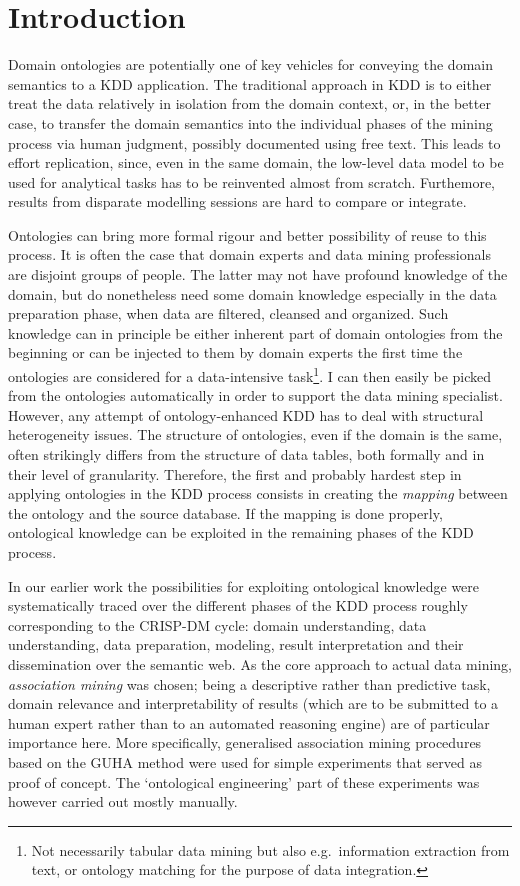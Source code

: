 \section{Introduction} \label{Introduction}

Domain ontologies are potentially one of key vehicles for conveying the domain semantics to a KDD application. 
The traditional approach in KDD is to either treat the data relatively in isolation from the domain context, or, in the better case, to transfer the domain semantics into the individual phases of the mining process via human judgment, possibly documented using free text.
This leads to effort replication, since, even in the same domain, the low-level data model to be used for analytical tasks has to be reinvented almost from scratch. 
Furthemore, results from disparate modelling sessions are hard to compare or integrate.

Ontologies can bring more formal rigour and better possibility of reuse to this process. 
It is often the case that domain experts and data mining professionals are disjoint groups of people.
The latter may not have profound knowledge of the domain, but do nonetheless need some domain knowledge especially in the data preparation phase, when data are filtered, cleansed and organized. 
Such knowledge can in principle be either inherent part of domain ontologies from the beginning or can be injected to them by domain experts the first time the ontologies are considered for a data-intensive task\footnote{Not necessarily tabular data mining but also e.g.~information extraction from text, or ontology matching for the purpose of data integration.}.
I can then easily be picked from the ontologies automatically in order to support the data mining specialist.
However, any attempt of ontology-enhanced KDD has to deal with structural heterogeneity issues. 
The structure of ontologies, even if the domain is the same, often strikingly differs from the structure of data tables, both formally and in their level of granularity. 
Therefore, the first and probably hardest step in applying ontologies in the KDD process consists in creating the \emph{mapping} between the ontology and the source database.
If the mapping is done properly, ontological knowledge can be exploited in the remaining phases of the KDD process.

In our earlier work \cite{Ontology} the possibilities for exploiting ontological knowledge were systematically traced over the different phases of the KDD process roughly corresponding to the CRISP-DM cycle: domain understanding, data understanding, data preparation, modeling, result interpretation and their dissemination over the semantic web. 
As the core approach to actual data mining, \emph{association mining} was chosen; being a descriptive rather than predictive task, domain relevance and interpretability of results (which are to be submitted to a human expert rather than to an automated reasoning engine) are of particular importance here.
More specifically, generalised association mining procedures based on the GUHA method \cite{GUHA} were used for simple experiments that served as proof of concept.
The `ontological engineering' part of these experiments was however carried out mostly manually.

